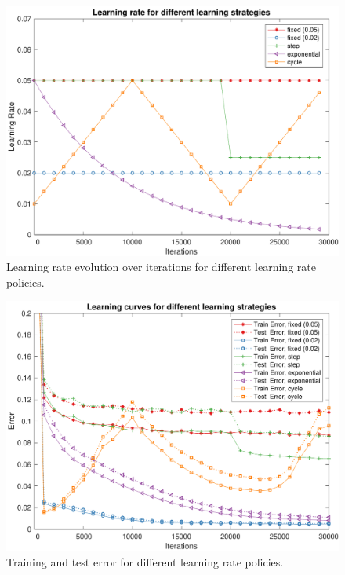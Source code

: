 \begin{figure}
	\centering
	\includegraphics[width=\columnwidth]{figures/learning_rates}
	\caption{Learning rate evolution over iterations for different learning rate policies.}
	\label{fig:learning_rates_policies}
\end{figure}

\begin{figure}
	\centering
	\includegraphics[width=\columnwidth]{figures/error_strategies.pdf}
	\caption{Training and test error for different learning rate policies.}
	\label{fig:lrp_training_error}
\end{figure}
